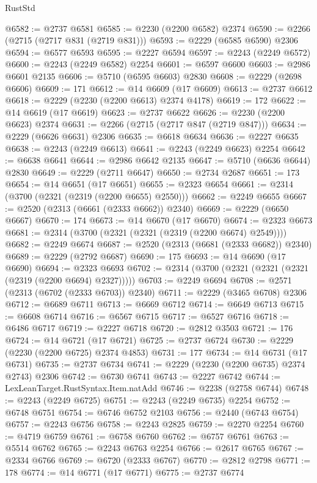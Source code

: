 \begin{lexlean}{RustStd}
\begin{coremodule}
{\begin{coremodule}
{{{{{{{{{{{{{{{{{{{{{{{{{{{{{{{{{{@6582 := @2737 @6581
@6585 := @2230 (@2200 @6582) @2374
@6590 := @2266 (@2715 (@2717 @831 (@2719 @831)))
@6593 := @2229 (@6585 @6590) @2306
@6594 := @6577 @6593
@6595 := @2227 @6594
@6597 := @2243 (@2249 @6572)
@6600 := @2243 (@2249 @6582) @2254
@6601 := @6597 @6600
@6603 := @2986 @6601 @2135
@6606 := @5710 (@6595 @6603) @2830
@6608 := @2229 (@2698 @6606)
@6609 := 171
@6612 := @14 @6609 (@17 @6609)
@6613 := @2737 @6612
@6618 := @2229 (@2230 (@2200 @6613) @2374 @4178)
@6619 := 172
@6622 := @14 @6619 (@17 @6619)
@6623 := @2737 @6622
@6626 := @2230 (@2200 @6623) @2374
@6631 := @2266 (@2715 (@2717 @847 (@2719 @847)))
@6634 := @2229 (@6626 @6631) @2306
@6635 := @6618 @6634
@6636 := @2227 @6635
@6638 := @2243 (@2249 @6613)
@6641 := @2243 (@2249 @6623) @2254
@6642 := @6638 @6641
@6644 := @2986 @6642 @2135
@6647 := @5710 (@6636 @6644) @2830
@6649 := @2229 (@2711 @6647)
@6650 := @2734 @2687
@6651 := 173
@6654 := @14 @6651 (@17 @6651)
@6655 := @2323 @6654
@6661 := @2314 (@3700 (@2321 (@2319 (@2200 @6655) @2550)))
@6662 := @2249 @6655
@6667 := @2520 (@2313 (@6661 (@2333 @6662)) @2340)
@6669 := @2229 (@6650 @6667)
@6670 := 174
@6673 := @14 @6670 (@17 @6670)
@6674 := @2323 @6673
@6681 := @2314 (@3700 (@2321 (@2321 (@2319 (@2200 @6674) @2549))))
@6682 := @2249 @6674
@6687 := @2520 (@2313 (@6681 (@2333 @6682)) @2340)
@6689 := @2229 (@2792 @6687)
@6690 := 175
@6693 := @14 @6690 (@17 @6690)
@6694 := @2323 @6693
@6702 := @2314 (@3700 (@2321 (@2321 (@2321 (@2319 (@2200 @6694) @2327)))))
@6703 := @2249 @6694
@6708 := @2571 (@2313 (@6702 (@2333 @6703)) @2340)
@6711 := @2229 (@3465 @6708) @2306
@6712 := @6689 @6711
@6713 := @6669 @6712
@6714 := @6649 @6713
@6715 := @6608 @6714
@6716 := @6567 @6715
@6717 := @6527 @6716
@6718 := @6486 @6717
@6719 := @2227 @6718
@6720 := @2812 @3503
@6721 := 176
@6724 := @14 @6721 (@17 @6721)
@6725 := @2737 @6724
@6730 := @2229 (@2230 (@2200 @6725) @2374 @4853)
@6731 := 177
@6734 := @14 @6731 (@17 @6731)
@6735 := @2737 @6734
@6741 := @2229 (@2230 (@2200 @6735) @2374 @2743) @2306
@6742 := @6730 @6741
@6743 := @2227 @6742
@6744 := LexLeanTarget.RustSyntax.Item.natAdd
@6746 := @2238 (@2758 @6744)
@6748 := @2243 (@2249 @6725)
@6751 := @2243 (@2249 @6735) @2254
@6752 := @6748 @6751
@6754 := @6746 @6752 @2103
@6756 := @2440 (@6743 @6754)
@6757 := @2243 @6756
@6758 := @2243 @2825
@6759 := @2270 @2254
@6760 := @4719 @6759
@6761 := @6758 @6760
@6762 := @6757 @6761
@6763 := @5514 @6762
@6765 := @2243 @6763 @2254
@6766 := @2617 @6765
@6767 := @2334 @6766
@6769 := @6720 (@2333 @6767)
@6770 := @2812 @2798
@6771 := 178
@6774 := @14 @6771 (@17 @6771)
@6775 := @2737 @6774
}}}}}}}}}}}}}}}}}}}}}}}}}}}}}}}}}}
\end{coremodule}}
\end{coremodule}
\end{lexlean}
